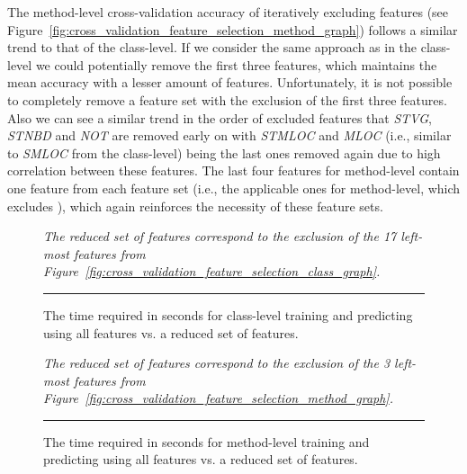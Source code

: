 The method-level cross-validation accuracy of iteratively excluding features (see Figure~\ref{fig:cross_validation_feature_selection_method_graph}) follows a similar trend to that of the class-level. If we consider the same approach as in the class-level we could potentially remove the first three features, which maintains the mean accuracy with a lesser amount of features. Unfortunately, it is not possible to completely remove a feature set with the exclusion of the first three features. Also we can see a similar trend in the order of excluded features that \emph{STVG}, \emph{STNBD} and \emph{NOT} are removed early on with \emph{STMLOC} and \emph{MLOC} (i.e., similar to \emph{SMLOC} from the class-level) being the last ones removed again due to high correlation between these features. The last four features for method-level contain one feature from each feature set (i.e., the applicable ones for method-level, which excludes ), which again reinforces the necessity of these feature sets.

\begin{figure}[ht!]
  \centering
  \begin{adjustbox}{max size={.95\textwidth}{.95\textheight}}
    
  \end{adjustbox}
  \caption{The time required in seconds for class-level training and predicting using all features vs. a reduced set of features.}  \vspace{1mm}
  \footnotesize{\emph{The reduced set of features correspond to the exclusion of the 17 left-most features from Figure~\ref{fig:cross_validation_feature_selection_class_graph}.}}
  \vspace{2mm}
  \hrule
  \label{fig:class_train_prediction_default_time_graph}
\end{figure}

\begin{figure}[ht!]
  \centering
  \begin{adjustbox}{max size={.95\textwidth}{.95\textheight}}
    
  \end{adjustbox}
  \caption{The time required in seconds for method-level training and predicting using all features vs. a reduced set of features.}
  \vspace{1mm}
  \footnotesize{\emph{The reduced set of features correspond to the exclusion of the 3 left-most features from Figure~\ref{fig:cross_validation_feature_selection_method_graph}.}}
  \vspace{2mm}
  \hrule
  \label{fig:method_train_prediction_default_time_graph}
\end{figure}

